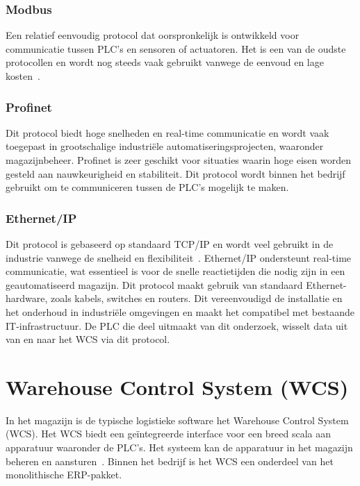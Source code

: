 \subsubsection{Modbus}
Een relatief eenvoudig protocol dat oorspronkelijk is ontwikkeld voor communicatie tussen PLC’s en sensoren of actuatoren. 
Het is een van de oudste protocollen en wordt nog steeds vaak gebruikt vanwege de eenvoud en lage kosten~\autocite{Joshi2024}. 

\subsubsection{Profinet}
Dit protocol biedt hoge snelheden en real-time communicatie 
en wordt vaak toegepast in grootschalige industriële automatiseringsprojecten, waaronder magazijnbeheer. 
Profinet is zeer geschikt voor situaties waarin hoge eisen worden gesteld aan nauwkeurigheid en stabiliteit.
Dit protocol wordt binnen het bedrijf gebruikt om te communiceren tussen de PLC's mogelijk te maken.

\subsubsection{Ethernet/IP}
Dit protocol is gebaseerd op standaard TCP/IP en wordt veel gebruikt in de industrie vanwege de snelheid en flexibiliteit~\autocite{Joshi2024}. 
Ethernet/IP ondersteunt real-time communicatie, wat essentieel is voor de snelle reactietijden die nodig zijn in een geautomatiseerd magazijn.
Dit protocol maakt gebruik van standaard Ethernet-hardware, zoals kabels, switches en routers. 
Dit vereenvoudigd de installatie en het onderhoud in industriële omgevingen en maakt het compatibel met bestaande IT-infrastructuur.
De PLC die deel uitmaakt van dit onderzoek, wisselt data uit van en naar het WCS via dit protocol.
\newpage

\section{Warehouse Control System (WCS)} 
In het magazijn is de typische logistieke software het Warehouse Control System (WCS). 
Het WCS biedt een geïntegreerde interface voor een breed scala aan apparatuur waaronder de PLC's. 
Het systeem kan de apparatuur in het magazijn beheren en aansturen~\autocite{Son2015}. 
Binnen het bedrijf is het WCS een onderdeel van het monolithische ERP-pakket.

